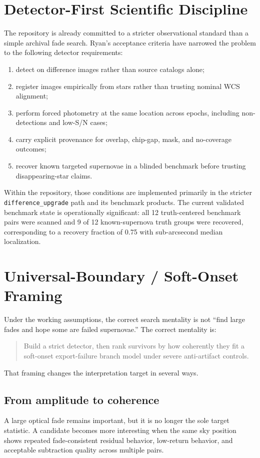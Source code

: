 \documentclass[11pt]{article}
\begin{document}
\section{Detector-First Scientific Discipline}

The repository is already committed to a stricter observational standard than a simple archival fade search. Ryan's acceptance criteria have narrowed the problem to the following detector requirements:
\begin{enumerate}[leftmargin=1.5em]
\item detect on difference images rather than source catalogs alone;
\item register images empirically from stars rather than trusting nominal WCS alignment;
\item perform forced photometry at the same location across epochs, including non-detections and low-S/N cases;
\item carry explicit provenance for overlap, chip-gap, mask, and no-coverage outcomes;
\item recover known targeted supernovae in a blinded benchmark before trusting disappearing-star claims.
\end{enumerate}

Within the repository, those conditions are implemented primarily in the stricter \texttt{difference\_upgrade} path and its benchmark products. The current validated benchmark state is operationally significant: all 12 truth-centered benchmark pairs were scanned and 9 of 12 known-supernova truth groups were recovered, corresponding to a recovery fraction of 0.75 with sub-arcsecond median localization.

\section{Universal-Boundary / Soft-Onset Framing}

Under the working assumptions, the correct search mentality is not ``find large fades and hope some are failed supernovae.'' The correct mentality is:
\begin{quote}
Build a strict detector, then rank survivors by how coherently they fit a soft-onset export-failure branch model under severe anti-artifact controls.
\end{quote}

That framing changes the interpretation target in several ways.

\subsection*{From amplitude to coherence}
A large optical fade remains important, but it is no longer the sole target statistic. A candidate becomes more interesting when the same sky position shows repeated fade-consistent residual behavior, low-return behavior, and acceptable subtraction quality across multiple pairs.
\end{document}
